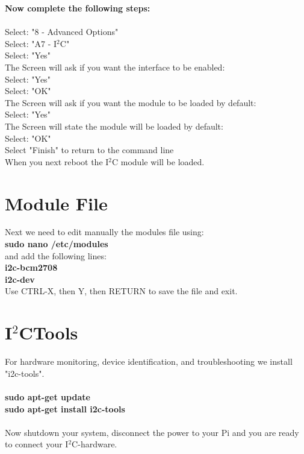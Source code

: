 \newpage
\textbf{Now complete the following steps:}\\\\
Select: "8 - Advanced Options"\\
Select: "A7 - I$^2$C"\\
Select: "Yes"\\
The Screen will ask if you want the interface to be enabled:\\
Select: "Yes"\\
Select: "OK"\\
The Screen will ask if you want the module to be loaded by default:\\
Select: "Yes"\\
The Screen will state the module will be loaded by default:\\
Select: "OK"\\
Select "Finish" to return to the command line \\
When you next reboot the I$^2$C module will be loaded.\\


\section{Module File}
\label{sec:modulefile}
Next we need to edit manually the modules file using:\\
\ttfamily \textbf{sudo nano /etc/modules}\\
\normalfont and add the following lines:\\
\ttfamily \textbf{i2c-bcm2708\\
									i2c-dev}\\
\normalfont									
Use CTRL-X, then Y, then RETURN to save the file and exit.								





\section{I$^2$CTools}
\label{sec:I2Ctools}

For hardware monitoring, device identification, and troubleshooting we install "i2c-tools".\\\\
\ttfamily \textbf{sudo apt-get update\\
									sudo apt-get install i2c-tools}\\\\
\normalfont
Now shutdown your system, disconnect the power to your Pi and you are ready to connect your I$^2$C-hardware.\\									


